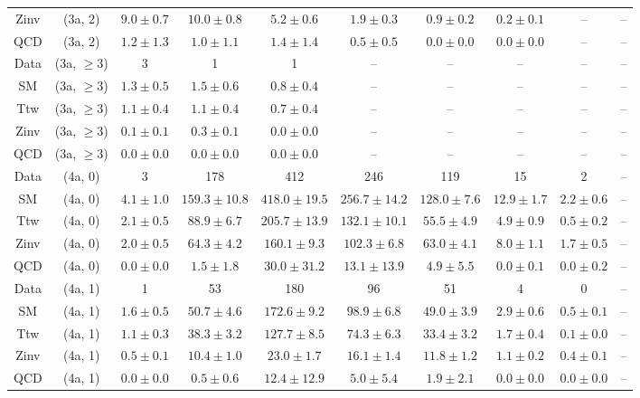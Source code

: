 \begin{table}[h!]
{\begin{tabular}{cccccccccc}
	Zinv & (3a, 2) & $9.0\pm 0.7$ & $10.0\pm 0.8$ & $5.2\pm 0.6$ & $1.9\pm 0.3$ & $0.9\pm 0.2$ & $0.2\pm 0.1$ & -- & -- \\[0.5ex] 
	QCD & (3a, 2) & $1.2\pm 1.3$ & $1.0\pm 1.1$ & $1.4\pm 1.4$ & $0.5\pm 0.5$ & $0.0\pm 0.0$ & $0.0\pm 0.0$ & -- & -- \\[0.5ex] 
	Data & (3a, $\ge3$) & 3 & 1 & 1 & -- & -- & -- & -- & -- \\[0.5ex] 
	SM & (3a, $\ge3$) & $1.3\pm 0.5$ & $1.5\pm 0.6$ & $0.8\pm 0.4$ & -- & -- & -- & -- & -- \\[0.5ex] 
	Ttw & (3a, $\ge3$) & $1.1\pm 0.4$ & $1.1\pm 0.4$ & $0.7\pm 0.4$ & -- & -- & -- & -- & -- \\[0.5ex] 
	Zinv & (3a, $\ge3$) & $0.1\pm 0.1$ & $0.3\pm 0.1$ & $0.0\pm 0.0$ & -- & -- & -- & -- & -- \\[0.5ex] 
	QCD & (3a, $\ge3$) & $0.0\pm 0.0$ & $0.0\pm 0.0$ & $0.0\pm 0.0$ & -- & -- & -- & -- & -- \\[0.5ex] 
	Data & (4a, 0) & 3 & 178 & 412 & 246 & 119 & 15 & 2 & -- \\[0.5ex] 
	SM & (4a, 0) & $4.1\pm 1.0$ & $159.3\pm 10.8$ & $418.0\pm 19.5$ & $256.7\pm 14.2$ & $128.0\pm 7.6$ & $12.9\pm 1.7$ & $2.2\pm 0.6$ & -- \\[0.5ex] 
	Ttw & (4a, 0) & $2.1\pm 0.5$ & $88.9\pm 6.7$ & $205.7\pm 13.9$ & $132.1\pm 10.1$ & $55.5\pm 4.9$ & $4.9\pm 0.9$ & $0.5\pm 0.2$ & -- \\[0.5ex] 
	Zinv & (4a, 0) & $2.0\pm 0.5$ & $64.3\pm 4.2$ & $160.1\pm 9.3$ & $102.3\pm 6.8$ & $63.0\pm 4.1$ & $8.0\pm 1.1$ & $1.7\pm 0.5$ & -- \\[0.5ex] 
	QCD & (4a, 0) & $0.0\pm 0.0$ & $1.5\pm 1.8$ & $30.0\pm 31.2$ & $13.1\pm 13.9$ & $4.9\pm 5.5$ & $0.0\pm 0.1$ & $0.0\pm 0.2$ & -- \\[0.5ex] 
	Data & (4a, 1) & 1 & 53 & 180 & 96 & 51 & 4 & 0 & -- \\[0.5ex] 
	SM & (4a, 1) & $1.6\pm 0.5$ & $50.7\pm 4.6$ & $172.6\pm 9.2$ & $98.9\pm 6.8$ & $49.0\pm 3.9$ & $2.9\pm 0.6$ & $0.5\pm 0.1$ & -- \\[0.5ex] 
	Ttw & (4a, 1) & $1.1\pm 0.3$ & $38.3\pm 3.2$ & $127.7\pm 8.5$ & $74.3\pm 6.3$ & $33.4\pm 3.2$ & $1.7\pm 0.4$ & $0.1\pm 0.0$ & -- \\[0.5ex] 
	Zinv & (4a, 1) & $0.5\pm 0.1$ & $10.4\pm 1.0$ & $23.0\pm 1.7$ & $16.1\pm 1.4$ & $11.8\pm 1.2$ & $1.1\pm 0.2$ & $0.4\pm 0.1$ & -- \\[0.5ex] 
	QCD & (4a, 1) & $0.0\pm 0.0$ & $0.5\pm 0.6$ & $12.4\pm 12.9$ & $5.0\pm 5.4$ & $1.9\pm 2.1$ & $0.0\pm 0.0$ & $0.0\pm 0.0$ & -- \\[0.5ex] 

\end{tabular}}
\end{table}
